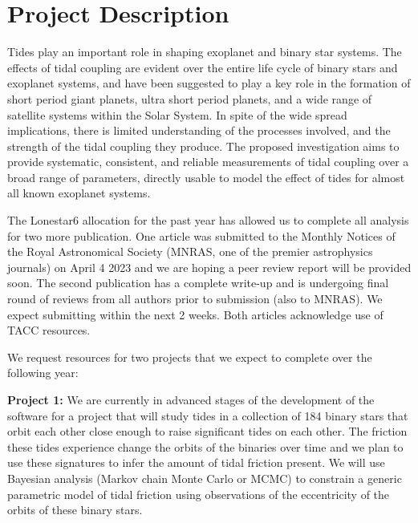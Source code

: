 \documentclass{article}
\begin{document}
\maketitle

\vspace{-15mm}

\section{Project Description}

Tides play an important role in shaping exoplanet and binary star systems. The
effects of tidal coupling are evident over the entire life cycle of binary stars
and exoplanet systems, and have been suggested to play a key role in the
formation of short period giant planets, ultra short period planets, and a wide
range of satellite systems within the Solar System. In spite of the wide spread
implications, there is limited understanding of the processes involved, and the
strength of the tidal coupling they produce. The proposed investigation aims to
provide systematic, consistent, and reliable measurements of tidal coupling over
a broad range of parameters, directly usable to model the effect of tides for
almost all known exoplanet systems.

The Lonestar6 allocation for the past year has allowed us to complete all
analysis for two more publication. One article was submitted to the Monthly
Notices of the Royal Astronomical Society (MNRAS, one of the premier
astrophysics journals) on April 4 2023 and we are hoping a peer review report
will be provided soon. The second publication has a complete write-up and is
undergoing final round of reviews from all authors prior to submission (also to
MNRAS). We expect submitting within the next 2 weeks. Both articles acknowledge
use of TACC resources.

We request resources for two projects that we expect to complete over the
following year:

\textbf{Project 1:} We are currently in advanced stages of the development of
the software for a project that will study tides in a collection of 184 binary
stars that orbit each other close enough to raise significant tides on each
other. The friction these tides experience change the orbits of the binaries
over time and we plan to use these signatures to infer the amount of tidal
friction present.  We will use Bayesian analysis (Markov chain Monte Carlo or
MCMC) to constrain a generic parametric model of tidal friction using
observations of the eccentricity of the orbits of these binary stars.
\end{document}

